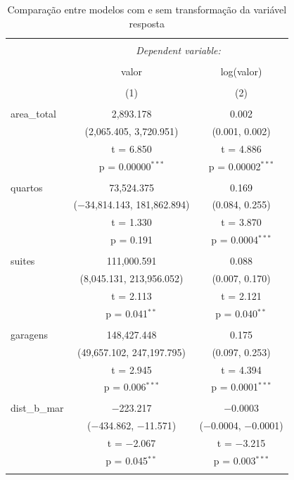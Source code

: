 \documentclass[a4paper]{article}
\begin{document}
\begin{table}[!htbp] \centering 
  \caption{Comparação entre modelos com e sem transformação da variável resposta} 
  \label{tab:tabela} 
\begin{tabular}{@{\extracolsep{5pt}}lcc} 
\\[-1.8ex]\hline 
\hline \\[-1.8ex] 
 & \multicolumn{2}{c}{\textit{Dependent variable:}} \\ 
\cline{2-3} 
\\[-1.8ex] & valor & log(valor) \\ 
\\[-1.8ex] & (1) & (2)\\ 
\hline \\[-1.8ex] 
 area\_total & 2,893.178 & 0.002 \\ 
  & (2,065.405, 3,720.951) & (0.001, 0.002) \\ 
  & t = 6.850 & t = 4.886 \\ 
  & p = 0.00000$^{***}$ & p = 0.00002$^{***}$ \\ 
  & & \\ 
 quartos & 73,524.375 & 0.169 \\ 
  & ($-$34,814.143, 181,862.894) & (0.084, 0.255) \\ 
  & t = 1.330 & t = 3.870 \\ 
  & p = 0.191 & p = 0.0004$^{***}$ \\ 
  & & \\ 
 suites & 111,000.591 & 0.088 \\ 
  & (8,045.131, 213,956.052) & (0.007, 0.170) \\ 
  & t = 2.113 & t = 2.121 \\ 
  & p = 0.041$^{**}$ & p = 0.040$^{**}$ \\ 
  & & \\ 
 garagens & 148,427.448 & 0.175 \\ 
  & (49,657.102, 247,197.795) & (0.097, 0.253) \\ 
  & t = 2.945 & t = 4.394 \\ 
  & p = 0.006$^{***}$ & p = 0.0001$^{***}$ \\ 
  & & \\ 
 dist\_b\_mar & $-$223.217 & $-$0.0003 \\ 
  & ($-$434.862, $-$11.571) & ($-$0.0004, $-$0.0001) \\ 
  & t = $-$2.067 & t = $-$3.215 \\ 
  & p = 0.045$^{**}$ & p = 0.003$^{***}$ \\ 
  & & \\ 

\end{tabular}
\end{table}
\end{document}
